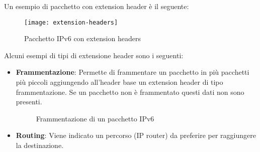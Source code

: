 \documentclass[a4paper]{article}
\begin{document}
\begin{example}
  Un esempio di pacchetto con extension header è il seguente:
  \begin{figure}[H]
    \centering
    \texttt{[image: extension-headers]}
    \caption{Pacchetto IPv6 con extension headers}
  \end{figure}
\end{example}
\begin{example}
  Alcuni esempi di tipi di extensione header sono i seguenti:
  \begin{itemize}
    \item \textbf{Frammentazione}: Permette di frammentare un pacchetto in più pacchetti
      più piccoli aggiungendo all'header base un extension header di tipo frammentazione.
      Se un pacchetto non è frammentato questi dati non sono presenti.
      \begin{figure}[H]
        \centering
        \caption{Frammentazione di un pacchetto IPv6}
      \end{figure}
    \item \textbf{Routing}: Viene indicato un percorso (IP router) da preferire per
      raggiungere la destinazione.
  \end{itemize}
\end{example}
\end{document}
